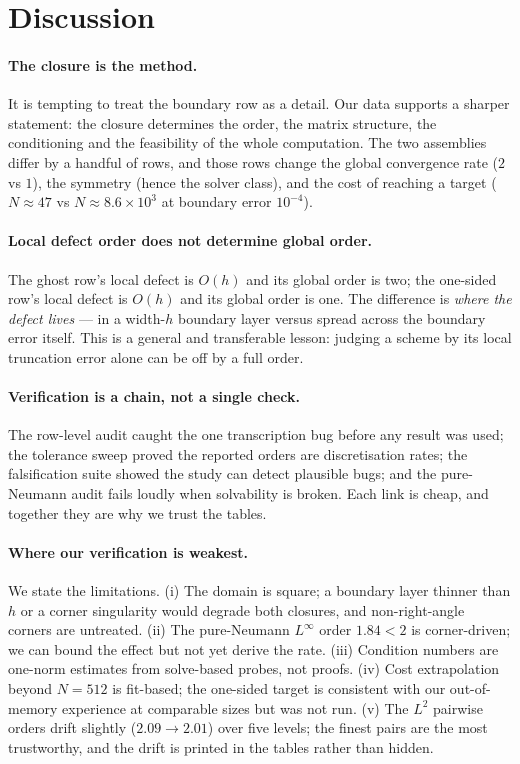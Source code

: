 \documentclass[11pt,a4paper]{article}
\begin{document}
\section{Discussion}
\label{sec:discussion}

\paragraph{The closure is the method.}
It is tempting to treat the boundary row as a detail. Our data supports a
sharper statement: the closure determines the order, the matrix structure,
the conditioning and the feasibility of the whole computation. The two
assemblies differ by a handful of rows, and those rows change the global
convergence rate ($2$ vs $1$), the symmetry (hence the solver class), and
the cost of reaching a target ($N \approx 47$ vs $N \approx 8.6\times10^3$
at boundary error $10^{-4}$).

\paragraph{Local defect order does not determine global order.}
The ghost row's local defect is $O(h)$ and its global order is two; the
one-sided row's local defect is $O(h)$ and its global order is one. The
difference is \emph{where the defect lives} --- in a width-$h$ boundary
layer versus spread across the boundary error itself. This is a general and
transferable lesson: judging a scheme by its local truncation error alone
can be off by a full order.

\paragraph{Verification is a chain, not a single check.}
The row-level audit caught the one transcription bug before any result was
used; the tolerance sweep proved the reported orders are discretisation
rates; the falsification suite showed the study can detect plausible bugs;
and the pure-Neumann audit fails loudly when solvability is broken. Each
link is cheap, and together they are why we trust the tables.

\paragraph{Where our verification is weakest.}
We state the limitations. (i) The domain is square; a boundary layer thinner
than $h$ or a corner singularity would degrade both closures, and
non-right-angle corners are untreated. (ii) The pure-Neumann $L^\infty$
order $1.84 < 2$ is corner-driven; we can bound the effect but not yet
derive the rate. (iii) Condition numbers are one-norm estimates from
solve-based probes, not proofs. (iv) Cost extrapolation beyond $N = 512$ is
fit-based; the one-sided target is consistent with our out-of-memory
experience at comparable sizes but was not run. (v) The $L^2$ pairwise
orders drift slightly ($2.09 \to 2.01$) over five levels; the finest pairs
are the most trustworthy, and the drift is printed in the tables rather
than hidden.
\end{document}
